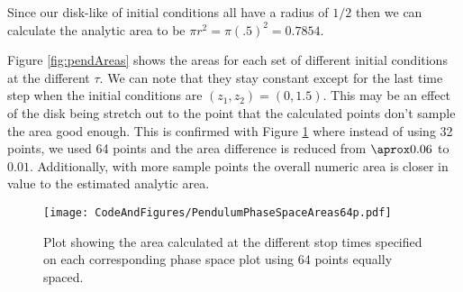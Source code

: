 Since our disk-like of initial conditions all have a radius of $1/2$ then we can calculate the analytic area to be $\pi r^2 = \pi(.5)^2=0.7854$.

Figure \ref{fig:pendAreas} shows the areas for each set of different initial conditions at the different $\tau$. We can note that they stay constant except for the last time step when the initial conditions are $(z_1,z_2)=(0,1.5)$. This may be an effect of the disk being stretch out to the point that the calculated points don't sample the area good enough. This is confirmed with Figure \ref{fig:pendAreas64} where instead of using 32 points, we used 64 points and the area difference is reduced from $\aprox 0.06$ to $0.01$. Additionally, with more sample points the overall numeric area is closer in value to the estimated analytic area. 

\begin{figure}
    \centering
    \texttt{[image: CodeAndFigures/PendulumPhaseSpaceAreas64p.pdf]}
    \caption{Plot showing the area calculated at the different stop times specified on each corresponding phase space plot using 64 points equally spaced.}
    \label{fig:pendAreas64}
\end{figure}
